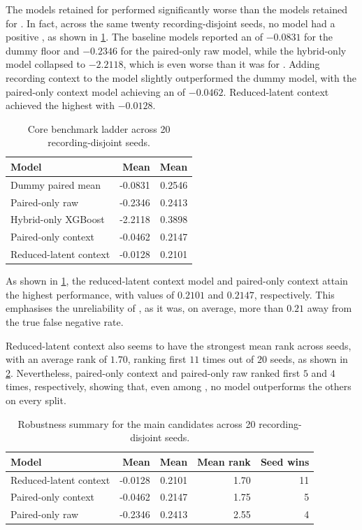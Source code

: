 The models retained for \fmiss{} performed significantly worse than the models retained for \fpos{}. In fact, across the same twenty recording-disjoint seeds, no model had a positive \rsq{}, as shown in \cref{tab:fmiss-summary}. The baseline models reported an \rsq{} of $-0.0831$ for the dummy floor and $-0.2346$ for the paired-only raw model, while the hybrid-only model collapsed to $-2.2118$, which is even worse than it was for \fpos{}. Adding recording context to the model slightly outperformed the dummy model, with the paired-only context model achieving an \rsq{} of $-0.0462$. Reduced-latent context achieved the highest \rsq{} with $-0.0128$.

\begin{table}[H]
    \centering
    \caption{Core \fmiss{} benchmark ladder across 20 recording-disjoint seeds.}
    \label{tab:fmiss-summary}
    \begin{tabular}{lrr}
        \toprule
        Model & Mean \rsq{} & Mean \mae{} \\
        \midrule
        Dummy paired mean & -0.0831 & 0.2546 \\
        Paired-only raw & -0.2346 & 0.2413 \\
        Hybrid-only XGBoost \parencite{ChenGuestrin2016} & -2.2118 & 0.3898 \\
        Paired-only context & -0.0462 & 0.2147 \\
        Reduced-latent context & -0.0128 & 0.2101 \\
        \bottomrule
    \end{tabular}
\end{table}

As shown in \cref{tab:fmiss-summary}, the reduced-latent context model and paired-only context attain the highest performance, with \mae{} values of $0.2101$ and $0.2147$, respectively. This emphasises the unreliability of \fmiss{}, as it was, on average, more than $0.21$ away from the true false negative rate.

Reduced-latent context also seems to have the strongest mean rank across seeds, with an average rank of $1.70$, ranking first $11$ times out of $20$ seeds, as shown in \cref{tab:fmiss-robustness}. Nevertheless, paired-only context and paired-only raw ranked first $5$ and $4$ times, respectively, showing that, even among \fmiss{}, no model outperforms the others on every split.

\begin{table}[H]
    \centering
    \caption{Robustness summary for the main \fmiss{} candidates across 20 recording-disjoint seeds.}
    \label{tab:fmiss-robustness}
    \begin{tabular}{lrrrr}
        \toprule
        Model & Mean \rsq{} & Mean \mae{} & Mean rank & Seed wins \\
        \midrule
        Reduced-latent context & -0.0128 & 0.2101 & 1.70 & 11 \\
        Paired-only context & -0.0462 & 0.2147 & 1.75 & 5 \\
        Paired-only raw & -0.2346 & 0.2413 & 2.55 & 4 \\
        \bottomrule
    \end{tabular}
\end{table}

